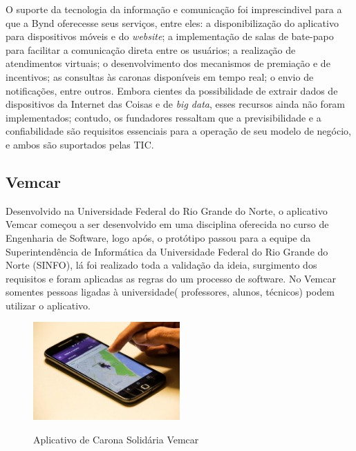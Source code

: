 O suporte da tecnologia da informação e comunicação foi imprescindivel para a que a Bynd oferecesse seus serviços, entre eles: a disponibilização do aplicativo para dispositivos móveis e do \textit{website}; a implementação de salas de bate-papo para facilitar a comunicação direta entre os usuários; a realização de atendimentos virtuais; o desenvolvimento dos mecanismos de premiação e de incentivos; as consultas às caronas disponíveis em tempo real; o envio de notificações, entre outros. Embora cientes da possibilidade de extrair dados de dispositivos da Internet das Coisas e de \textit{big data}, esses recursos ainda não foram implementados; contudo, os fundadores ressaltam que a previsibilidade e a confiabilidade são requisitos essenciais para a operação de seu modelo de negócio, e ambos são suportados pelas TIC. 


\subsection{Vemcar}

Desenvolvido na Universidade Federal do Rio Grande do Norte, o aplicativo Vemcar começou a ser desenvolvido em uma disciplina oferecida no curso de Engenharia de Software, logo após, o protótipo passou para a equipe da Superintendência de Informática da Universidade Federal do Rio Grande do Norte (SINFO), lá foi realizado toda a validação da ideia, surgimento dos requisitos e foram aplicadas as regras do um processo de software. No Vemcar somentes pessoas ligadas à universidade( professores, alunos, técnicos) podem utilizar o aplicativo.


\begin{figure}[!hbtp]
	\centering
	\caption{Aplicativo de Carona Solidária Vemcar}
	\includegraphics[width=0.5\textwidth]{./04-figuras/vemcar.jpg}
	\label{fig:tecnologia}
\end{figure}


